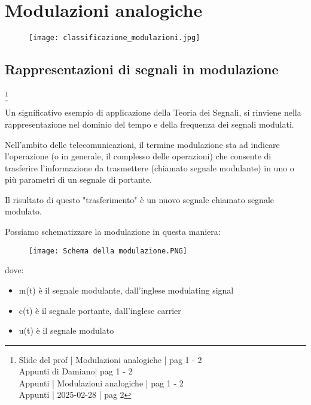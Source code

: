 \chapter{Modulazioni analogiche}

\begin{figure}[h]
    \centering
    \texttt{[image: classificazione\_modulazioni.jpg]}
\end{figure}

\newpage 

\section{Rappresentazioni di segnali in modulazione}
\footnote{Slide del prof | Modulazioni analogiche | pag 1 - 2 \\  
Appunti di Damiano| pag 1 - 2 \\
Appunti | Modulazioni analogiche | pag 1 - 2 \\
Appunti | 2025-02-28 | pag 2
} 

Un significativo esempio di applicazione della Teoria dei Segnali, si rinviene nella rappresentazione 
nel dominio del tempo e della frequenza dei segnali modulati. \newline 

Nell'ambito delle telecomunicazioni, il termine modulazione sta ad indicare l'operazione (o in generale, il complesso delle operazioni) 
che consente di trasferire l'informazione da trasmettere (chiamato segnale modulante) in uno o più parametri di un segnale di portante. \newline 

Il risultato di questo "trasferimento" è un nuovo segnale chiamato segnale modulato. \newline 

Possiamo schematizzare la modulazione in questa maniera: 

\begin{figure}[h]
    \centering
    \texttt{[image: Schema della modulazione.PNG]}
\end{figure}

dove: 

\begin{itemize}
    \item  m(t) è il segnale modulante, dall'inglese modulating signal 
    \item c(t) è il segnale portante, dall'inglese carrier
    \item u(t) è il segnale modulato
\end{itemize}

